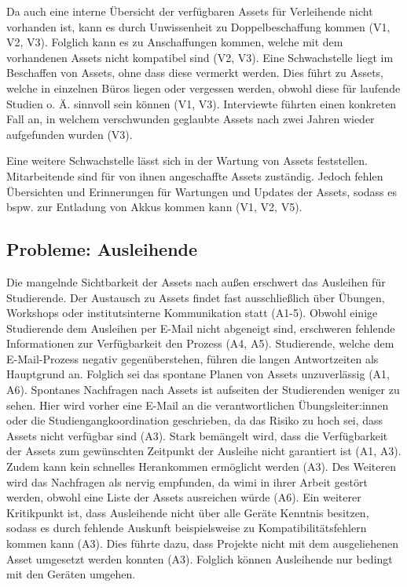 Da auch eine interne Übersicht der verfügbaren Assets für Verleihende nicht
vorhanden ist, kann es durch Unwissenheit zu Doppelbeschaffung kommen (V1, V2,
V3). Folglich kann es zu Anschaffungen kommen, welche mit dem vorhandenen Assets
nicht kompatibel sind (V2, V3). Eine Schwachstelle liegt im Beschaffen von
Assets, ohne dass diese vermerkt werden. Dies führt zu Assets, welche in
einzelnen Büros liegen oder vergessen werden, obwohl diese für laufende Studien
o. Ä. sinnvoll sein können (V1, V3). Interviewte führten einen konkreten Fall
an, in welchem verschwunden geglaubte Assets nach zwei Jahren wieder aufgefunden
wurden (V3).

Eine weitere Schwachstelle lässt sich in der Wartung von Assets feststellen.
Mitarbeitende sind für von ihnen angeschaffte Assets zuständig. Jedoch fehlen
Übersichten und Erinnerungen für Wartungen und Updates der Assets, sodass es
bspw. zur Entladung von Akkus kommen kann (V1, V2, V5).

\subsection{Probleme: Ausleihende}
\label{section:probleme-Ausleihende}
Die mangelnde Sichtbarkeit der Assets nach außen erschwert das Ausleihen für
Studierende. Der Austausch zu Assets findet fast ausschließlich über Übungen,
Workshops oder institutsinterne Kommunikation statt (A1-5). Obwohl einige
Studierende dem Ausleihen per E-Mail nicht abgeneigt sind, erschweren fehlende
Informationen zur Verfügbarkeit den Prozess (A4, A5). Studierende, welche dem
E-Mail-Prozess negativ gegenüberstehen, führen die langen Antwortzeiten als
Hauptgrund an. Folglich sei das spontane Planen von Assets unzuverlässig (A1,
A6). Spontanes Nachfragen nach Assets ist aufseiten der Studierenden weniger zu
sehen. Hier wird vorher eine E-Mail an die verantwortlichen Übungsleiter:innen
oder die Studiengangkoordination geschrieben, da das Risiko zu hoch sei, dass
Assets nicht verfügbar sind (A3). Stark bemängelt wird, dass die Verfügbarkeit
der Assets zum gewünschten Zeitpunkt der Ausleihe nicht garantiert ist (A1, A3).
Zudem kann kein schnelles Herankommen ermöglicht werden (A3). Des Weiteren wird
das Nachfragen als nervig empfunden, da \ac{wimi} in ihrer Arbeit gestört
werden, obwohl eine Liste der Assets ausreichen würde (A6). Ein weiterer
Kritikpunkt ist, dass Ausleihende nicht über alle Geräte Kenntnis besitzen,
sodass es durch fehlende Auskunft beispielsweise zu Kompatibilitätsfehlern kommen kann
(A3). Dies führte dazu, dass Projekte nicht mit dem ausgeliehenen Asset
umgesetzt werden konnten (A3). Folglich können Ausleihende nur bedingt mit den
Geräten umgehen.


